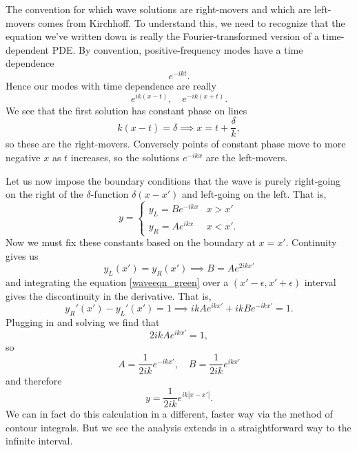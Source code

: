 The convention for which wave solutions are right-movers and which are left-movers comes from Kirchhoff. To understand this, we need to recognize that the equation we've written down is really the Fourier-transformed version of a time-dependent PDE. By convention, positive-frequency modes have a time dependence
\begin{equation}
    e^{-ikt}.
\end{equation}
Hence our modes with time dependence are really
\begin{equation}
    e^{ik(x-t)},\quad e^{-ik(x+t)}.
\end{equation}
We see that the first solution has constant phase on lines
\begin{equation}
    k(x-t)= \delta \implies x = t + \frac{\delta}{k},
\end{equation}
so these are the right-movers. Conversely points of constant phase move to more negative $x$ as $t$ increases, so the solutions $e^{-ikx}$ are the left-movers.

Let us now impose the boundary conditions that the wave is purely right-going on the right of the $\delta$-function $\delta(x-x')$ and left-going on the left. That is,
\begin{equation}
    y = \begin{cases}
        y_L = Be^{-ikx} & x > x'\\
        y_R = A e^{ikx} & x < x'.
    \end{cases}
\end{equation}
Now we must fix these constants based on the boundary at $x=x'$. Continuity gives us
\begin{equation}
    y_L(x') = y_R(x') \implies B=Ae^{2ik x'}
\end{equation}
and integrating the equation \ref{waveeqn_green} over a $(x'-\epsilon, x' + \epsilon)$ interval gives the discontinuity in the derivative. That is,
\begin{equation}
    y_R'(x') - y_L'(x') = 1 \implies
    ikA e^{ikx'} + ik B e^{-ikx'} = 1.
\end{equation}
Plugging in and solving we find that
\begin{equation}
    2ikA e^{ikx'} = 1,
\end{equation}
so
\begin{equation}
    A= \frac{1}{2ik} e^{-ikx'}, \quad B = \frac{1}{2ik} e^{ikx'}
\end{equation}
and therefore
\begin{equation}
    y= \frac{1}{2ik} e^{ik|x-x'|}.
\end{equation}
We can in fact do this calculation in a different, faster way via the method of contour integrals. But we see the analysis extends in a straightforward way to the infinite interval.

